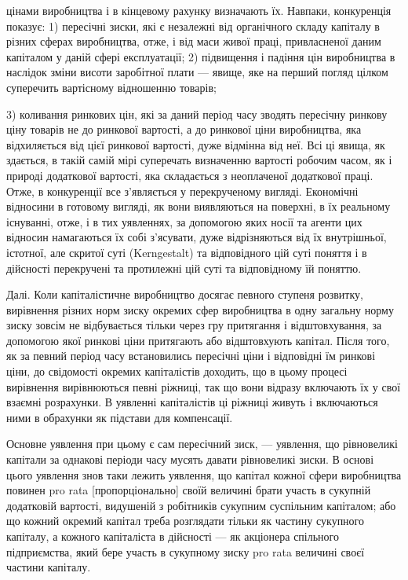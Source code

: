 \parcont{}  %
цінами виробництва і в кінцевому рахунку визначають їх. Навпаки,
конкуренція показує: 1) пересічні зиски, які є незалежні від
органічного складу капіталу в різних сферах виробництва, отже,
і від маси живої праці, привласненої даним капіталом у даній сфері
експлуатації; 2) підвищення і падіння цін виробництва в наслідок
зміни висоти заробітної плати — явище, яке на перший
погляд цілком суперечить вартісному відношенню товарів;

3) коливання ринкових цін, які за даний період часу зводять
пересічну ринкову ціну товарів не до ринкової вартості, а до
ринкової ціни виробництва, яка відхиляється від цієї ринкової
вартості, дуже відмінна від неї. Всі ці явища, як здається, в такій
самій мірі суперечать визначенню вартості робочим часом,
як і природі додаткової вартості, яка складається з неоплаченої
додаткової праці. Отже, в конкуренції все з’являється у перекрученому
вигляді. Економічні відносини в готовому вигляді, як
вони виявляються на поверхні, в їх реальному існуванні, отже,
і в тих уявленнях, за допомогою яких носії та агенти цих
відносин намагаються їх собі з’ясувати, дуже відрізняються
від їх внутрішньої, істотної, але скритої суті (Kerngestalt) та відповідного
цій суті поняття і в дійсності перекручені та протилежні
цій суті та відповідному їй поняттю.

Далі. Коли капіталістичне виробництво досягає певного ступеня
розвитку, вирівнення різних норм зиску окремих сфер виробництва
в одну загальну норму зиску зовсім не відбувається
тільки через гру притягання і відштовхування, за допомогою
якої ринкові ціни притягають або відштовхують капітал. Після
того, як за певний період часу встановились пересічні ціни
і відповідні їм ринкові ціни, до свідомості окремих капіталістів
доходить, що в цьому процесі вирівнення вирівнюються певні
ріжниці, так що вони відразу включають їх у свої взаємні розрахунки.
В уявленні капіталістів ці ріжниці живуть і включаються
ними в обрахунки як підстави для компенсації.

Основне уявлення при цьому є сам пересічний зиск, —
уявлення, що рівновеликі капітали за однакові періоди часу мусять
давати рівновеликі зиски. В основі цього уявлення знов
таки лежить уявлення, що капітал кожної сфери виробництва
повинен pro rata [пропорціонально] своїй величині брати участь
в сукупній додатковій вартості, видушеній з робітників сукупним
суспільним капіталом; або що кожний окремий капітал треба
розглядати тільки як частину сукупного капіталу, а кожного
капіталіста в дійсності — як акціонера спільного підприємства,
який бере участь в сукупному зиску pro rata величині своєї частини
капіталу.

